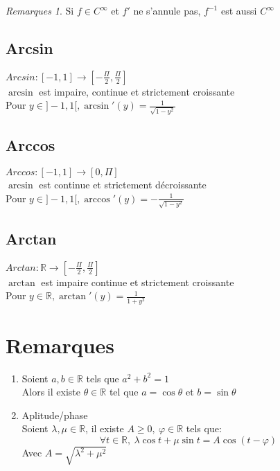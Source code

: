\documentclass[fleqn]{article}
\theoremstyle{definition} \newtheorem*{defi}{D\'efinition}
\theoremstyle{definition} \newtheorem*{theo}{Th\'eor\`eme}
\theoremstyle{definition} \newtheorem*{prop}{Propri\'et\'e}
\theoremstyle{remark} \newtheorem*{rqs}{Remarques}
\begin{document}
\begin{rqs}
	Si $f \in C^{\infty}$ et $f'$ ne s'annule pas, $f^{-1}$ est aussi $C^{\infty}$
\end{rqs}

\subsection{Arcsin}
\(Arcsin: [-1,1] \rightarrow [-\frac{\Pi}{2}, \frac{\Pi}{2}]\) \\
\(\arcsin\) est impaire, continue et strictement croissante \\
Pour \(y \in ]-1,1[, \arcsin'(y) = \frac{1}{\sqrt{1-y^2}}\) \\

\subsection{Arccos}
\(Arccos: [-1,1] \rightarrow [0, \Pi]\) \\
\(\arcsin\) est continue et strictement d\'{e}croissante \\
Pour \(y \in ]-1,1[, \arccos'(y) = -\frac{1}{\sqrt{1-y^2}}\) \\

\subsection{Arctan}
\(Arctan: \mathbb{R} \rightarrow [-\frac{\Pi}{2},\frac{\Pi}{2}]\) \\
\(\arctan\) est impaire continue et strictement croissante \\
Pour \(y \in \mathbb{R}, \arctan'(y) = \frac{1}{1+y^2}\) \\

\section{Remarques}
\begin{enumerate}
	\item Soient $a,b \in \mathbb{R}$ tels que $a^2 + b^2 = 1$\\
		Alors il existe $\theta \in \mathbb{R}$ tel que $a = \cos \theta$ et $b = \sin \theta$
	\item Aplitude/phase \\
		Soient $\lambda, \mu \in \mathbb{R}$, il existe $A \geq 0,\ \varphi \in \mathbb{R}$ tels que:
		\[\forall t \in \mathbb{R},\ \lambda \cos t + \mu \sin t = A\cos(t - \varphi)\]
		Avec $A = \sqrt{\lambda^2 + \mu^2}$
\end{enumerate}
\end{document}
